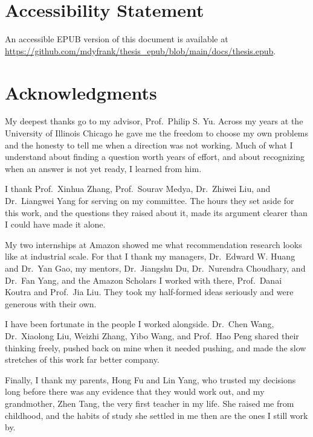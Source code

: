 \documentclass[12pt,reqno,oneside]{amsbook}
\theoremstyle{definition}
\begin{document}
\setcounter{page}{2} %

\chapter*{Accessibility Statement}
\begin{sloppypar}
\noindent
An accessible EPUB version of this document is available at
\url{https://github.com/mdyfrank/thesis_epub/blob/main/docs/thesis.epub}.
\end{sloppypar}



\chapter*{Acknowledgments}
My deepest thanks go to my advisor, Prof.~Philip S. Yu. Across my years at the University of
Illinois Chicago he gave me the freedom to choose my own problems and the honesty to tell me
when a direction was not working. Much of what I understand about finding a question worth
years of effort, and about recognizing when an answer is not yet ready, I learned from him.

I thank Prof.~Xinhua Zhang, Prof.~Sourav Medya, Dr.~Zhiwei Liu, and Dr.~Liangwei Yang for
serving on my committee. The hours they set aside for this work, and the questions they raised
about it, made its argument clearer than I could have made it alone.

My two internships at Amazon showed me what recommendation research looks like at industrial
scale. For that I thank my managers, Dr.~Edward W. Huang and Dr.~Yan Gao, my mentors,
Dr.~Jiangshu Du, Dr.~Nurendra Choudhary, and Dr.~Fan Yang, and the Amazon Scholars I worked
with there, Prof.~Danai Koutra and Prof.~Jia Liu. They took my half-formed ideas seriously and
were generous with their own.

I have been fortunate in the people I worked alongside. Dr.~Chen Wang, Dr.~Xiaolong Liu,
Weizhi Zhang, Yibo Wang, and Prof.~Hao Peng shared their thinking freely, pushed back on mine
when it needed pushing, and made the slow stretches of this work far better company.

Finally, I thank my parents, Hong Fu and Lin Yang, who trusted my decisions long before there
was any evidence that they would work out, and my grandmother, Zhen Tang, the very first
teacher in my life. She raised me from childhood, and the habits of study she settled in me
then are the ones I still work by.
\end{document}
